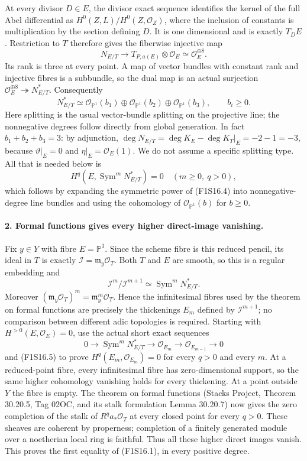 At every divisor $D\in E$, the divisor exact sequence identifies the
kernel of the full Abel differential as
$H^0(Z,L)/H^0(Z,\mathcal O_Z)$, where the inclusion of constants is
multiplication by the section defining $D$. It is one dimensional
and is exactly $T_DE$. Restriction to $T$ therefore gives the
fiberwise injective map
\[
          N_{E/T}\longrightarrow T_{P,a(E)}\otimes\mathcal O_E
                                      \simeq\mathcal O_E^{\oplus8}.
 \tag{F1S16.3}
\]
Its rank is three at every point. A map of vector bundles with constant
rank and injective fibres is a subbundle, so the dual map is an actual
surjection $\mathcal O_E^{\oplus8}\twoheadrightarrow N^*_{E/T}$.
Consequently
\[
 N^*_{E/T}\simeq\mathcal O_{\mathbb P^1}(b_1)\oplus
 \mathcal O_{\mathbb P^1}(b_2)\oplus\mathcal O_{\mathbb P^1}(b_3),
                  \qquad b_i\geq0.
 \tag{F1S16.4}
\]
Here splitting is the usual vector-bundle splitting on the projective
line; the nonnegative degrees follow directly from global generation.
In fact $b_1+b_2+b_3=3$: by adjunction,
$\deg N_{E/T}=\deg K_E-\deg K_T|_E=-2-1=-3$, because
$\vartheta|_E=0$ and $\eta|_E=\mathcal O_E(1)$.
We do not assume a specific splitting type. All that is needed below is
\[
       H^q(E,\operatorname{Sym}^m N^*_{E/T})=0
                    \quad(m\geq0,\ q>0),
 \tag{F1S16.5}
\]
which follows by expanding the symmetric power of (F1S16.4) into
nonnegative-degree line bundles and using the cohomology of
$\mathcal O_{\mathbb P^1}(b)$ for $b\geq0$.

\paragraph{2. Formal functions gives every higher direct-image vanishing.}
Fix $y\in Y$ with fibre $E=\mathbb P^1$. Since the scheme fibre is this
reduced pencil, its ideal in $T$ is exactly
$\mathcal I=\mathfrak m_y\mathcal O_T$. Both $T$ and $E$ are smooth,
so this is a regular embedding and
\[
 \mathcal I^m/\mathcal I^{m+1}
                    \simeq\operatorname{Sym}^m N^*_{E/T}.
 \tag{F1S16.6}
\]
Moreover $(\mathfrak m_y\mathcal O_T)^m=
\mathfrak m_y^m\mathcal O_T$. Hence the infinitesimal fibres used by
the theorem on formal functions are precisely the thickenings
$E_m$ defined by $\mathcal I^{m+1}$; no comparison between different
adic topologies is required. Starting with $H^{>0}(E,\mathcal O_E)=0$,
use the actual short exact sequences
\[
 0\longrightarrow\operatorname{Sym}^mN^*_{E/T}
 \longrightarrow\mathcal O_{E_m}
 \longrightarrow\mathcal O_{E_{m-1}}\longrightarrow0
\]
and (F1S16.5) to prove $H^q(E_m,\mathcal O_{E_m})=0$ for every $q>0$
and every $m$. At a reduced-point fibre, every infinitesimal fibre has
zero-dimensional support, so the same higher cohomology vanishing
holds for every thickening. At a point outside $Y$ the fibre is empty.
The theorem on formal functions (Stacks Project, Theorem 30.20.5,
Tag 02OC, and its stalk formulation Lemma 30.20.7) now gives the zero completion of the stalk of
$R^qa_*\mathcal O_T$ at every closed point for every $q>0$.
These sheaves are coherent by properness; completion of a finitely
generated module over a noetherian local ring is faithful. Thus all
these higher direct images vanish. This proves the first equality of
(F1S16.1), in every positive degree.

